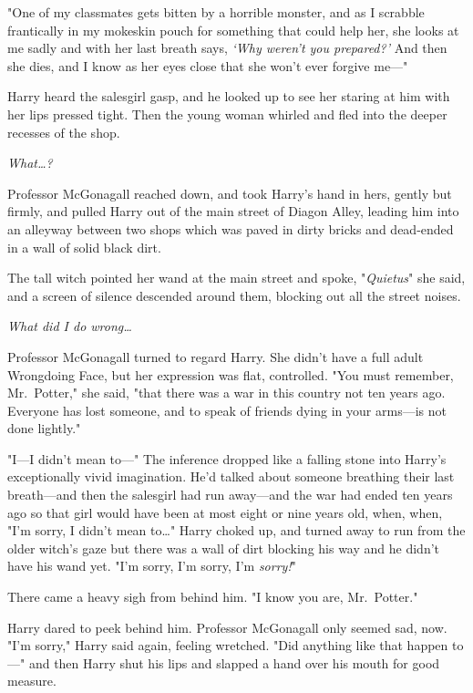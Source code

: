 "One of my classmates gets bitten by a horrible monster, and as I scrabble 
frantically in my mokeskin pouch for something that could help her, she looks 
at me sadly and with her last breath says, \emph{`Why weren't you prepared?'} 
And then she dies, and I know as her eyes close that she won't ever forgive 
me---"

Harry heard the salesgirl gasp, and he looked up to see her staring at him with 
her lips pressed tight. Then the young woman whirled and fled into the deeper 
recesses of the shop.

\emph{What{\ldots}?}

Professor McGonagall reached down, and took Harry's hand in hers, gently but 
firmly, and pulled Harry out of the main street of Diagon Alley, leading him 
into an alleyway between two shops which was paved in dirty bricks and 
dead-ended in a wall of solid black dirt.

The tall witch pointed her wand at the main street and spoke, "\emph{Quietus}" 
she said, and a screen of silence descended around them, blocking out all the 
street noises.

\emph{What did I do wrong{\ldots}}

Professor McGonagall turned to regard Harry. She didn't have a full adult 
Wrongdoing Face, but her expression was flat, controlled. "You must remember, 
Mr.~Potter," she said, "that there was a war in this country not ten years ago. 
Everyone has lost someone, and to speak of friends dying in your arms---is not 
done lightly."

"I---I didn't mean to---" The inference dropped like a falling stone into 
Harry's exceptionally vivid imagination. He'd talked about someone breathing 
their last breath---and then the salesgirl had run away---and the war had ended 
ten years ago so that girl would have been at most eight or nine years old, 
when, when, "I'm sorry, I didn't mean to{\ldots}" Harry choked up, and turned 
away to run from the older witch's gaze but there was a wall of dirt blocking 
his way and he didn't have his wand yet. "I'm sorry, I'm sorry, I'm 
\emph{sorry!}"

There came a heavy sigh from behind him. "I know you are, Mr.~Potter."

Harry dared to peek behind him. Professor McGonagall only seemed sad, now. "I'm 
sorry," Harry said again, feeling wretched. "Did anything like that happen 
to---" and then Harry shut his lips and slapped a hand over his mouth for good 
measure.

